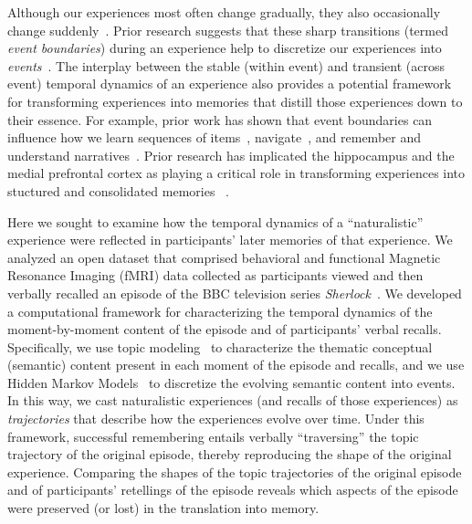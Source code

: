 \documentclass{article}
\begin{document}
Although our experiences most often change gradually, they also occasionally change suddenly~\citep[e.g., when we walk through a doorway; ][]{RadvZack17}.  Prior research suggests that these sharp transitions (termed \textit{event boundaries}) during an experience help to discretize our experiences into \textit{events}~\citep{RadvZack17, BrunEtal18, HeusEtal18b, ClewDava17, EzzyDava11, DuBrDava13}.  The interplay between the stable (within event) and transient (across event) temporal dynamics of an experience also provides a potential framework for transforming experiences into memories that distill those experiences down to their essence.  For example, prior work has shown that event boundaries can influence how we learn sequences of items~\citep{HeusEtal18b, DuBrDava13}, navigate~\citep{BrunEtal18}, and remember and understand narratives~\citep{ZwaaRadv98, EzzyDava11}. Prior research has implicated the hippocampus and the medial prefrontal cortex as playing a critical role in transforming experiences into stuctured and consolidated memories ~\citep{TompDava17}.

Here we sought to examine how the temporal dynamics of a ``naturalistic'' experience were reflected in participants' later memories of that experience.  We analyzed an open dataset that comprised behavioral and functional Magnetic Resonance Imaging (fMRI) data collected as participants viewed and then verbally recalled an episode of the BBC television series \textit{Sherlock}~\citep{ChenEtal17}.  We developed a computational framework for characterizing the temporal dynamics of the moment-by-moment content of the episode and of participants' verbal recalls.  Specifically, we use topic modeling~\citep{BleiEtal03} to characterize the thematic conceptual (semantic) content present in each moment of the episode and recalls, and we use Hidden Markov Models~\citep{Rabi89, BaldEtal17} to discretize the evolving semantic content into events.  In this way, we cast naturalistic experiences (and recalls of those experiences) as \textit{trajectories} that describe how the experiences evolve over time. Under this framework, successful remembering entails verbally ``traversing'' the topic trajectory of the original episode, thereby reproducing the shape of the original experience.  Comparing the shapes of the topic trajectories of the original episode and of participants' retellings of the episode reveals which aspects of the episode were preserved (or lost) in the translation into memory. 

\end{document}
